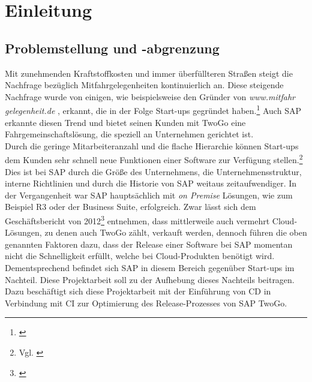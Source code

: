 
\chapter{Einleitung}



\section{Problemstellung und -abgrenzung}
Mit zunehmenden Kraftstoffkosten und immer überfüllteren Straßen steigt die Nachfrage bezüglich Mitfahrgelegenheiten kontinuierlich an. Diese steigende Nachfrage wurde von einigen, wie beispielsweise den Gründer von \textit{www.mitfahr\\gelegenheit.de }, erkannt, die in der Folge Start-ups gegründet haben.\footnote{\cite{carpooling}} Auch SAP erkannte diesen Trend  und bietet seinen Kunden mit TwoGo eine Fahrgemeinschaftslösung, die speziell an Unternehmen gerichtet ist. \\ Durch die geringe Mitarbeiteranzahl und die flache Hierarchie können Start-ups dem Kunden sehr schnell neue Funktionen einer Software zur Verfügung stellen.\footnote{Vgl. \cite[Seite 7ff]{swartout_continuous_2012}} Dies ist bei SAP durch die Größe des Unternehmens, die Unternehmensstruktur, interne Richtlinien und durch die Historie von SAP weitaus zeitaufwendiger.  In der Vergangenheit war SAP hauptsächlich mit \textit{on Premise} Lösungen, wie zum Beispiel R3 oder der Business Suite, erfolgreich. Zwar lässt sich dem Geschäftsbericht von 2012\footnote{\cite[Seite 100f]{sap-2012-geschaeftsbericht.pdf}} entnehmen, dass mittlerweile auch  vermehrt Cloud-Lösungen, zu denen auch TwoGo zählt, verkauft werden, dennoch führen die oben genannten Faktoren dazu, dass der Release einer Software bei SAP momentan nicht die Schnelligkeit erfüllt, welche bei Cloud-Produkten benötigt wird. Dementsprechend befindet sich SAP in diesem Bereich gegenüber Start-ups im Nachteil. Diese Projektarbeit soll zu der Aufhebung dieses Nachteils beitragen.\\
Dazu beschäftigt sich diese Projektarbeit mit der Einführung von \acl{CD} in Verbindung mit \acl{CI} zur Optimierung des Release-Prozesses von SAP TwoGo. 

